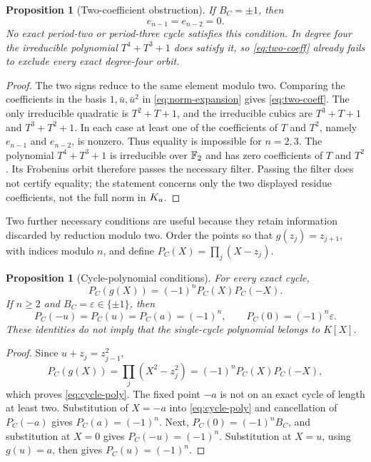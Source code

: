 \documentclass[11pt]{article}
\newtheorem{proposition}[theorem]{Proposition}
\theoremstyle{definition}
\theoremstyle{remark}
\begin{document}
\begin{proposition}[Two-coefficient obstruction]
\label{prop:two-coeff}
If \(B_C=\pm1\), then
\begin{equation}
  e_{n-1}=e_{n-2}=0.
  \label{eq:two-coeff}
\end{equation}
No exact period-two or period-three cycle satisfies this condition.  In
degree four the irreducible polynomial \(T^4+T^3+1\) does satisfy it, so
\eqref{eq:two-coeff} already fails to exclude every exact degree-four orbit.
\end{proposition}

\begin{proof}
The two signs reduce to the same element modulo two.  Comparing the
coefficients in the basis \(1,\bar u,\bar u^2\) in
\eqref{eq:norm-expansion} gives
\eqref{eq:two-coeff}.  The only irreducible quadratic is
\(T^2+T+1\), and the irreducible cubics are
\(T^3+T+1\) and \(T^3+T^2+1\).  In each case at least one of the
coefficients of \(T\) and \(T^2\), namely \(e_{n-1}\) and
\(e_{n-2}\), is nonzero.  Thus equality is impossible for \(n=2,3\).
The polynomial \(T^4+T^3+1\) is irreducible over \(\mathbb{F}_2\) and has zero
coefficients of \(T\) and \(T^2\).  Its Frobenius orbit therefore passes
the necessary filter.  Passing the filter does not certify equality; the
statement concerns only the two displayed residue coefficients, not the full
norm in \(K_u\).
\end{proof}

Two further necessary conditions are useful because they retain information
discarded by reduction modulo two.  Order the points so that
\(g(z_j)=z_{j+1}\), with indices modulo \(n\), and define
\(P_C(X)=\prod_j(X-z_j)\).

\begin{proposition}[Cycle-polynomial conditions]
\label{prop:cycle-poly}
For every exact cycle,
\begin{equation}
  P_C(g(X))=(-1)^nP_C(X)P_C(-X).
  \label{eq:cycle-poly}
\end{equation}
If \(n\ge2\) and \(B_C=\varepsilon\in\{\pm1\}\), then
\begin{equation}
  P_C(-u)=P_C(u)=P_C(a)=(-1)^n,
  \qquad P_C(0)=(-1)^n\varepsilon.
  \label{eq:special-values}
\end{equation}
These identities do not imply that the single-cycle polynomial belongs to
\(K[X]\).
\end{proposition}

\begin{proof}
Since \(u+z_j=z_{j-1}^2\),
\[
  P_C(g(X))=\prod_j(X^2-z_j^2)
           =(-1)^nP_C(X)P_C(-X),
\]
which proves \eqref{eq:cycle-poly}.  The fixed point \(-a\) is not on an
exact cycle of length at least two.  Substitution of \(X=-a\) into
\eqref{eq:cycle-poly} and cancellation of \(P_C(-a)\) gives
\(P_C(a)=(-1)^n\).  Next,
\(P_C(0)=(-1)^nB_C\), and substitution at \(X=0\) gives
\(P_C(-u)=(-1)^n\).  Substitution at \(X=u\), using \(g(u)=a\), then
gives \(P_C(u)=(-1)^n\).
\end{proof}
\end{document}
